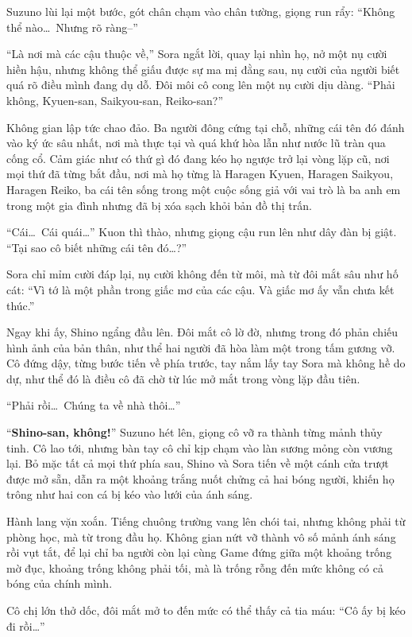\documentclass[../main.tex]{subfiles}
\begin{document}
Suzuno lùi lại một bước, gót chân chạm vào chân tường, giọng run rẩy: ``Không thể nào\dots\ Nhưng rõ ràng--''

``Là nơi mà các cậu thuộc về,'' Sora ngắt lời, quay lại nhìn họ, nở một nụ cười hiền hậu, nhưng không thể giấu được sự ma mị đằng sau, nụ cười của người biết quá rõ điều mình đang dụ dỗ. Đôi môi cô cong lên một nụ cười dịu dàng. ``Phải không, Kyuen-san, Saikyou-san, Reiko-san?''

Không gian lập tức chao đảo. Ba người đông cứng tại chỗ, những cái tên đó đánh vào ký ức sâu nhất, nơi mà thực tại và quá khứ hòa lẫn như nước lũ tràn qua cống cổ. Cảm giác như có thứ gì đó đang kéo họ ngược trở lại vòng lặp cũ, nơi mọi thứ đã từng bắt đầu, nơi mà họ từng là Haragen Kyuen, Haragen Saikyou, Haragen Reiko, ba cái tên sống trong một cuộc sống giả với vai trò là ba anh em trong một gia đình nhưng đã bị xóa sạch khỏi bản đồ thị trấn.

``Cái\dots\ Cái quái\dots'' Kuon thì thào, nhưng giọng cậu run lên như dây đàn bị giật. ``Tại sao cô biết những cái tên đó\dots?''

Sora chỉ mỉm cười đáp lại,  nụ cười không đến từ môi, mà từ đôi mắt sâu như hố cát: ``Vì tớ là một phần trong giấc mơ của các cậu. Và giấc mơ ấy vẫn chưa kết thúc.''

Ngay khi ấy, Shino ngẩng đầu lên. Đôi mắt cô lờ đờ, nhưng trong đó phản chiếu hình ảnh của bản thân, như thể hai người đã hòa làm một trong tấm gương vỡ. Cô đứng dậy, từng bước tiến về phía trước, tay nắm lấy tay Sora mà không hề do dự, như thể đó là điều cô đã chờ từ lúc mở mắt trong vòng lặp đầu tiên.

``Phải rồi\dots\ Chúng ta về nhà thôi\dots''

``\textbf{Shino-san, không!}'' Suzuno hét lên, giọng cô vỡ ra thành từng mảnh thủy tinh. Cô lao tới, nhưng bàn tay cô chỉ kịp chạm vào làn sương mỏng còn vương lại. Bỏ mặc tất cả mọi thứ phía sau, Shino và Sora tiến về một cánh cửa trượt được mở sẵn,  dẫn ra một khoảng trắng nuốt chửng cả hai bóng người, khiến họ trông như hai con cá bị kéo vào lưới của ánh sáng.

Hành lang vặn xoắn. Tiếng chuông trường vang lên chói tai, nhưng không phải từ phòng học, mà từ trong đầu họ. Không gian nứt vỡ thành vô số mảnh ánh sáng rồi vụt tắt, để lại chỉ ba người còn lại cùng Game đứng giữa một khoảng trống mờ đục, khoảng trống không phải tối, mà là trống rỗng đến mức không có cả bóng của chính mình.

Cô chị lớn thở dốc, đôi mắt mở to đến mức có thể thấy cả tia máu: ``Cô ấy bị kéo đi rồi\dots''
\end{document}
